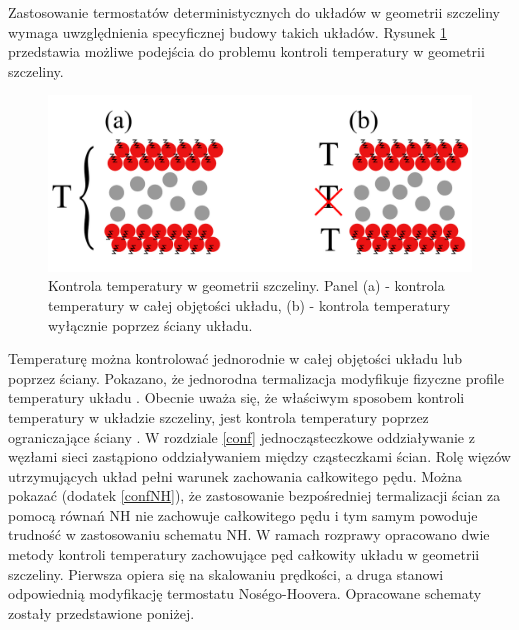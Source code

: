 \documentclass[12pt,a4paper,openright]{report} %
\begin{document}
%
%
Zastosowanie termostatów deterministycznych do układów w geometrii szczeliny wymaga uwzględnienia specyficznej budowy takich układów.
Rysunek \ref{ewolT} przedstawia możliwe podejścia do problemu kontroli temperatury w geometrii szczeliny.
\begin{figure}[h!]
\centering
\includegraphics[width=12cm, clip]{rysunki/ewolucjaT.pdf}
\caption{Kontrola temperatury w geometrii szczeliny. Panel (a) - kontrola temperatury w całej objętości układu, (b) - kontrola temperatury wyłącznie poprzez ściany układu.}
\label{ewolT}
\end{figure}
%
%
Temperaturę można kontrolować jednorodnie w całej objętości układu lub poprzez ściany. Pokazano, że jednorodna termalizacja modyfikuje fizyczne profile temperatury układu \cite{LiemBrownClarke, DeLuca2014}. Obecnie uważa się, że właściwym sposobem kontroli temperatury w układzie szczeliny, jest kontrola temperatury poprzez ograniczające ściany \cite{DeLuca2014}. W rozdziale \ref{conf} jednocząsteczkowe oddziaływanie z węzłami sieci zastąpiono oddziaływaniem między cząsteczkami ścian. Rolę więzów utrzymujących układ pełni warunek zachowania całkowitego pędu. Można pokazać (dodatek \ref{confNH}), że zastosowanie bezpośredniej termalizacji ścian za pomocą równań NH nie zachowuje całkowitego pędu i tym samym powoduje trudność w zastosowaniu schematu NH. W ramach rozprawy opracowano dwie metody kontroli temperatury zachowujące pęd całkowity układu w geometrii szczeliny. Pierwsza opiera się na skalowaniu prędkości, a druga stanowi odpowiednią modyfikację termostatu Nos\'{e}go-Hoovera. Opracowane schematy zostały przedstawione poniżej.
%
\end{document}
